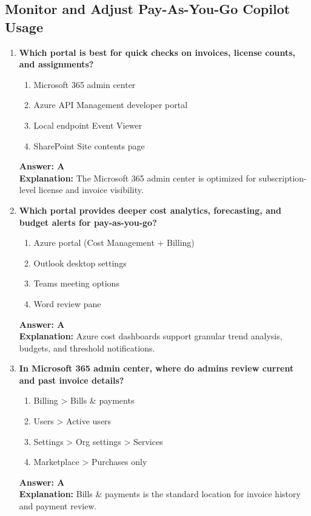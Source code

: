 \documentclass[10pt]{article}
\begin{document}
\subsection{Monitor and Adjust Pay-As-You-Go Copilot Usage}
\begin{enumerate}[leftmargin=*]

\item \textbf{Which portal is best for quick checks on invoices, license counts, and assignments?}
\begin{enumerate}[label=\Alph*.]
  \item Microsoft 365 admin center
  \item Azure API Management developer portal
  \item Local endpoint Event Viewer
  \item SharePoint Site contents page
\end{enumerate}
\textbf{Answer: A}\\
\textbf{Explanation:} The Microsoft 365 admin center is optimized for subscription-level license and invoice visibility.

\item \textbf{Which portal provides deeper cost analytics, forecasting, and budget alerts for pay-as-you-go?}
\begin{enumerate}[label=\Alph*.]
  \item Azure portal (Cost Management + Billing)
  \item Outlook desktop settings
  \item Teams meeting options
  \item Word review pane
\end{enumerate}
\textbf{Answer: A}\\
\textbf{Explanation:} Azure cost dashboards support granular trend analysis, budgets, and threshold notifications.

\item \textbf{In Microsoft 365 admin center, where do admins review current and past invoice details?}
\begin{enumerate}[label=\Alph*.]
  \item Billing > Bills \& payments
  \item Users > Active users
  \item Settings > Org settings > Services
  \item Marketplace > Purchases only
\end{enumerate}
\textbf{Answer: A}\\
\textbf{Explanation:} Bills \& payments is the standard location for invoice history and payment review.


\end{enumerate}
\end{document}
